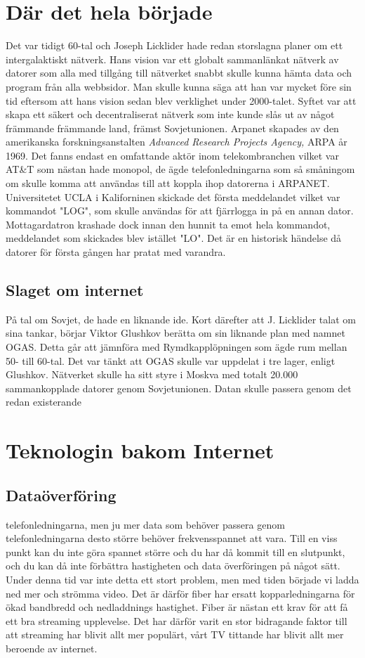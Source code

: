 \documentclass[a4paper,11pt]{article}
\begin{document}
\section{Där det hela började}
Det var tidigt 60-tal och Joseph Licklider hade redan storslagna planer om ett
intergalaktiskt nätverk. Hans vision var ett globalt sammanlänkat nätverk av
datorer som alla med tillgång till nätverket snabbt skulle kunna hämta data och
program från alla webbsidor. Man skulle kunna säga att han var mycket före sin
tid eftersom att hans vision sedan blev verklighet under 2000-talet. Syftet var
att skapa ett säkert och decentraliserat nätverk som inte kunde slås ut av något
främmande främmande land, främst Sovjetunionen. Arpanet skapades av den
amerikanska forskningsanstalten \textit{Advanced Research Projects Agency,} ARPA
år 1969. Det fanns endast en omfattande aktör inom telekombranchen vilket var
AT\&T som nästan hade monopol, de ägde telefonledningarna som så småningom om
skulle komma att användas till att koppla ihop datorerna i ARPANET.
Universitetet UCLA i Kaliforninen skickade det första meddelandet vilket var
kommandot "LOG", som skulle användas för att fjärrlogga in på en annan dator.
Mottagardatron krashade dock innan den hunnit ta emot hela kommandot,
meddelandet som skickades blev istället "LO". Det är en historisk händelse då
datorer för första gången har pratat med varandra.

\subsection{Slaget om internet}
På tal om Sovjet, de hade en liknande ide. Kort därefter att J. Licklider talat
om sina tankar, börjar Viktor Glushkov berätta om sin liknande plan med namnet
OGAS. Detta går att jämnföra med Rymdkapplöpningen som ägde rum mellan 50- till
60-tal. Det var tänkt att OGAS skulle var uppdelat i tre lager, enligt Glushkov.
Nätverket skulle ha sitt styre i Moskva med totalt 20.000 sammankopplade datorer
genom Sovjetunionen. Datan skulle passera genom det redan existerande

\section{Teknologin bakom Internet}
\subsection{Dataöverföring}
telefonledningarna, men ju mer data som behöver passera genom telefonledningarna
desto större behöver frekvensspannet att vara. Till en viss punkt kan du inte
göra spannet större och du har då kommit till en slutpunkt, och du kan då inte
förbättra hastigheten och data överföringen på något sätt. Under denna tid var
inte detta ett stort problem, men med tiden började vi ladda ned mer och strömma
video. Det är därför fiber har ersatt kopparledningarna för ökad bandbredd och
nedladdnings hastighet. Fiber är nästan ett krav för att få ett bra streaming
upplevelse. Det har därför varit en stor bidragande faktor till att streaming
har blivit allt mer populärt, vårt TV tittande har blivit allt mer beroende av
internet.
\end{document}
